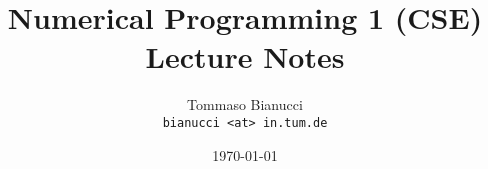 
\graphicspath{ {Figures/} }

\title{Numerical Programming 1 (CSE)\\Lecture Notes}
\author{Tommaso Bianucci\\\small{\texttt{bianucci <at> in.tum.de}}}
\date{\today}


\maketitle
\tableofcontents
 



% 
% 
% 


